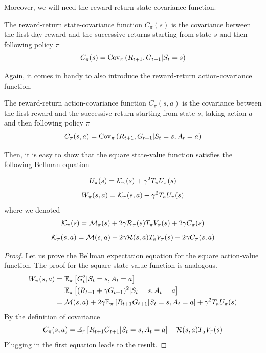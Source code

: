 Moreover, we will need the reward-return state-covariance function. 
\begin{definition}
	The reward-return state-covariance function $C_\pi(s)$ is the covariance between the first day reward and the successive returns starting from state $s$ and then following policy $\pi$
	\begin{equation}
		C_\pi(s) = \Cov[\pi]{R_{t+1}, G_{t+1} | S_t = s}
	\end{equation}
\end{definition}
Again, it comes in handy to also introduce the reward-return action-covariance function. 
\begin{definition}
	The reward-return action-covariance function $C_\pi(s,a)$ is the covariance between the first reward and the successive return starting from state $s$, taking action $a$ and then following policy $\pi$
	\begin{equation}
		C_\pi(s,a) = \Cov[\pi]{R_{t+1}, G_{t+1} | S_t = s, A_t = a}
	\end{equation}
\end{definition}
Then, it is easy to show that the square state-value function satisfies the following Bellman equation 
\begin{proposition}
\begin{equation}
	U_\pi(s) = \calK_\pi(s) + \gamma^2 T_\pi U_\pi(s)
\end{equation}
\begin{equation}
	\begin{split}
		W_\pi(s,a) = \calK_\pi(s, a) + \gamma^2 T_a U_\pi(s)
	\end{split}
\end{equation}
where we denoted
\begin{equation}
	\mathcal{K}_\pi(s) = \calM_\pi(s) + 2\gamma \calR_\pi(s) T_\pi V_\pi(s) + 2 \gamma C_\pi(s)
\end{equation}
\begin{equation}
	\calK_\pi(s, a) = \calM(s,a) + 2\gamma \calR(s,a) T_a V_\pi(s) + 2 \gamma C_\pi(s, a)
\end{equation}
\end{proposition}
\begin{proof}
	Let us prove the Bellman expectation equation for the square action-value function. The proof for the square state-value function is analogous. 
	\begin{equation*}
		\begin{split}
			W_\pi(s,a) &= \E[\pi]{G_t^2 | S_t = s, A_t = a}\\
					   &= \E[\pi]{(R_{t+1} + \gamma G_{t+1})^2 | S_t = s, A_t = a}\\
					   &= \calM(s,a) + 2\gamma \E[\pi]{R_{t+1}G_{t+1} | S_t = s, A_t = a} + \gamma^2 T_a U_\pi(s)
		\end{split}
	\end{equation*}
	By the definition of covariance
	\begin{equation*}
			C_\pi(s,a) = \E[\pi]{R_{t+1}G_{t+1} | S_t = s, A_t = a} - \calR(s,a) T_a V_\pi(s)
	\end{equation*}
	Plugging in the first equation leads to the result.
\end{proof}
